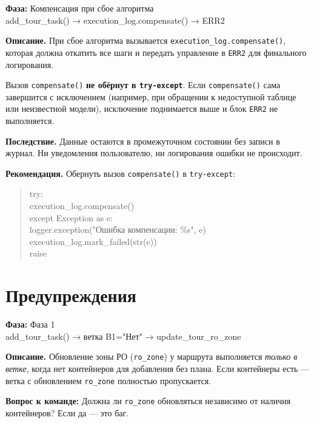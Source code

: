 \documentclass[11pt, a4paper, oneside]{article}
\newcommand{\coderef}[1]{{\footnotesize\color{MidGray}\ttfamily #1}}
\begin{document}
\begin{critbox}[title={🔴 \#4 — Сбой в самой компенсации не обрабатывается}]

\textbf{Фаза:} Компенсация при сбое алгоритма\\
\coderef{add\_tour\_task() → execution\_log.compensate() → ERR2}

\textbf{Описание.}
При сбое алгоритма вызывается \texttt{execution\_log.compensate()},
которая должна откатить все шаги и передать управление в \texttt{ERR2}
для финального логирования.

Вызов \texttt{compensate()} \textbf{не обёрнут в \texttt{try-except}}.
Если \texttt{compensate()} сама завершится с исключением
(например, при обращении к недоступной таблице или неизвестной модели),
исключение поднимается выше и блок \texttt{ERR2} не выполняется.

\textbf{Последствие.}
Данные остаются в промежуточном состоянии без записи в журнал.
Ни уведомления пользователю, ни логирования ошибки не происходит.

\textbf{Рекомендация.}
Обернуть вызов \texttt{compensate()} в \texttt{try-except}:
\begin{quote}\ttfamily\small
try:\\
\quad execution\_log.compensate()\\
except Exception as e:\\
\quad logger.exception("Ошибка компенсации: \%s", e)\\
\quad execution\_log.mark\_failed(str(e))\\
raise
\end{quote}
\end{critbox}

\section{Предупреждения}

\begin{warnbox}[title={⚠️ \#5 — Обновление зоны РО пропускается при наличии контейнеров}]

\textbf{Фаза:} Фаза 1\\
\coderef{add\_tour\_task() → ветка B1="Нет" → update\_tour\_ro\_zone}

\textbf{Описание.}
Обновление зоны РО (\texttt{ro\_zone}) у маршрута выполняется
\emph{только в ветке}, когда нет контейнеров для добавления без плана.
Если контейнеры есть — ветка с обновлением \texttt{ro\_zone} полностью пропускается.

\textbf{Вопрос к команде:} Должна ли \texttt{ro\_zone} обновляться независимо
от наличия контейнеров? Если да — это баг.
\end{warnbox}
\end{document}
